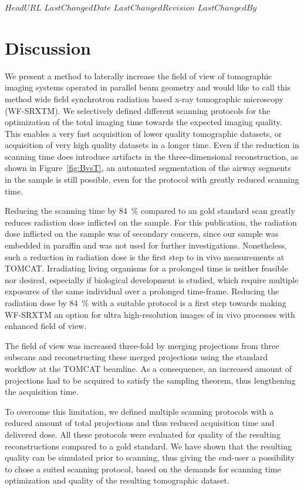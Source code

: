 \svnidlong
{$HeadURL$}
{$LastChangedDate$}
{$LastChangedRevision$}
{$LastChangedBy$}
%
\section{Discussion}\label{sec:Discussion}

We present a method to laterally increase the field of view of tomographic imaging systems operated in parallel beam geometry and would like to call this method wide field synchrotron radiation based x-ray tomographic microscopy (WF-SRXTM). We selectively defined different scanning protocols for the optimization of the total imaging time towards the expected imaging quality. This enables a very fast acquisition of lower quality tomographic datasets, or acquisition of very high quality datasets in a longer time. Even if the reduction in scanning time does introduce artifacts in the three-dimensional reconstruction, as shown in Figure~\ref{fig:BvsT}, an automated segmentation of the airway segments in the sample is still possible, even for the protocol with greatly reduced scanning time.

Reducing the scanning time by \SI{84}{\percent} compared to an gold standard scan greatly reduces radiation dose inflicted on the sample. For this publication, the radiation dose inflicted on the sample was of secondary concern, since our sample was embedded in paraffin and was not used for further investigations. Nonetheless, such a reduction in radiation dose is the first step to in vivo measurements at TOMCAT. Irradiating living organisms for a prolonged time is neither feasible nor desired, especially if biological development is studied, which require multiple exposures of the same individual over a prolonged time-frame. Reducing the radiation dose by \SI{84}{\percent} with a suitable protocol is a first step towards making WF-SRXTM an option for ultra high-resolution images of in vivo processes with enhanced field of view.

The field of view was increased three-fold by merging projections from three subscans and reconstructing these merged projections using the standard workflow at the TOMCAT beamline. As a consequence, an increased amount of projections had to be acquired to satisfy the sampling theorem, thus lengthening the acquisition time.

To overcome this limitation, we defined multiple scanning protocols with a reduced amount of total projections and thus reduced acquisition time and delivered dose. All these protocols were evaluated for quality of the resulting reconstructions compared to a gold standard. We have shown that the resulting quality can be simulated prior to scanning, thus giving the end-user a possibility to chose a suited scanning protocol, based on the demands for scanning time optimization and quality of the resulting tomographic dataset.


